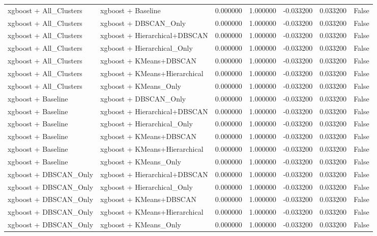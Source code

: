 \begin{tabular}{llrrrrr}
xgboost + All_Clusters & xgboost + Baseline & 0.000000 & 1.000000 & -0.033200 & 0.033200 & False \\
xgboost + All_Clusters & xgboost + DBSCAN_Only & 0.000000 & 1.000000 & -0.033200 & 0.033200 & False \\
xgboost + All_Clusters & xgboost + Hierarchical+DBSCAN & 0.000000 & 1.000000 & -0.033200 & 0.033200 & False \\
xgboost + All_Clusters & xgboost + Hierarchical_Only & 0.000000 & 1.000000 & -0.033200 & 0.033200 & False \\
xgboost + All_Clusters & xgboost + KMeans+DBSCAN & 0.000000 & 1.000000 & -0.033200 & 0.033200 & False \\
xgboost + All_Clusters & xgboost + KMeans+Hierarchical & 0.000000 & 1.000000 & -0.033200 & 0.033200 & False \\
xgboost + All_Clusters & xgboost + KMeans_Only & 0.000000 & 1.000000 & -0.033200 & 0.033200 & False \\
xgboost + Baseline & xgboost + DBSCAN_Only & 0.000000 & 1.000000 & -0.033200 & 0.033200 & False \\
xgboost + Baseline & xgboost + Hierarchical+DBSCAN & 0.000000 & 1.000000 & -0.033200 & 0.033200 & False \\
xgboost + Baseline & xgboost + Hierarchical_Only & 0.000000 & 1.000000 & -0.033200 & 0.033200 & False \\
xgboost + Baseline & xgboost + KMeans+DBSCAN & 0.000000 & 1.000000 & -0.033200 & 0.033200 & False \\
xgboost + Baseline & xgboost + KMeans+Hierarchical & 0.000000 & 1.000000 & -0.033200 & 0.033200 & False \\
xgboost + Baseline & xgboost + KMeans_Only & 0.000000 & 1.000000 & -0.033200 & 0.033200 & False \\
xgboost + DBSCAN_Only & xgboost + Hierarchical+DBSCAN & 0.000000 & 1.000000 & -0.033200 & 0.033200 & False \\
xgboost + DBSCAN_Only & xgboost + Hierarchical_Only & 0.000000 & 1.000000 & -0.033200 & 0.033200 & False \\
xgboost + DBSCAN_Only & xgboost + KMeans+DBSCAN & 0.000000 & 1.000000 & -0.033200 & 0.033200 & False \\
xgboost + DBSCAN_Only & xgboost + KMeans+Hierarchical & 0.000000 & 1.000000 & -0.033200 & 0.033200 & False \\
xgboost + DBSCAN_Only & xgboost + KMeans_Only & 0.000000 & 1.000000 & -0.033200 & 0.033200 & False \\

\end{tabular}
